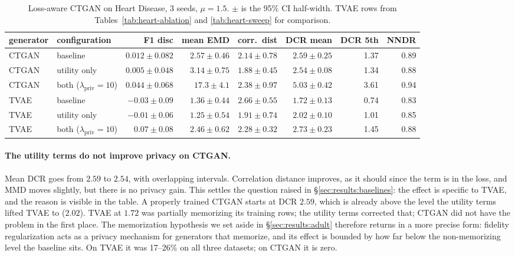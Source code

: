 \documentclass[11pt,a4paper]{article}
\newcommand{\lpriv}{\lambda_{\text{priv}}}
\begin{document}
\begin{table}[htbp]
\caption{Loss-aware CTGAN on Heart Disease, 3 seeds, $\mu = 1.5$. $\pm$ is
the 95\% CI half-width. TVAE rows from Tables~\ref{tab:heart-ablation} and
\ref{tab:heart-sweep} for comparison.}
\label{tab:ctgan-lossaware}
\centering\small
\begin{adjustbox}{max width=\textwidth}
\begin{tabular}{@{}llrrrrrr@{}}
\toprule
generator & configuration & F1 disc & mean EMD & corr.\ dist & DCR mean & DCR 5th & NNDR \\
\midrule
CTGAN & baseline      & $0.012 \pm 0.082$ & $2.57 \pm 0.46$ & $2.14 \pm 0.78$ & $2.59 \pm 0.25$ & 1.37 & 0.89 \\
CTGAN & utility only  & $0.005 \pm 0.048$ & $3.14 \pm 0.75$ & $1.88 \pm 0.45$ & $2.54 \pm 0.08$ & 1.34 & 0.88 \\
CTGAN & both ($\lpriv = 10$) & $0.044 \pm 0.068$ & $17.3 \pm 4.1$ & $2.38 \pm 0.97$ & $5.03 \pm 0.42$ & 3.61 & 0.94 \\
\midrule
TVAE  & baseline      & $-0.03 \pm 0.09$ & $1.36 \pm 0.44$ & $2.66 \pm 0.55$ & $1.72 \pm 0.13$ & 0.74 & 0.83 \\
TVAE  & utility only  & $-0.01 \pm 0.06$ & $1.25 \pm 0.54$ & $1.91 \pm 0.74$ & $2.02 \pm 0.10$ & 1.01 & 0.85 \\
TVAE  & both ($\lpriv = 10$) & $0.07 \pm 0.08$ & $2.46 \pm 0.62$ & $2.28 \pm 0.32$ & $2.73 \pm 0.23$ & 1.45 & 0.88 \\
\bottomrule
\end{tabular}
\end{adjustbox}
\end{table}

\paragraph{The utility terms do not improve privacy on CTGAN.} Mean DCR goes
from $2.59$ to $2.54$, with overlapping intervals. Correlation distance
improves, as it should since the term is in the loss, and MMD moves slightly,
but there is no privacy gain. This settles the question raised in
\S\ref{sec:results:baselines}: the effect is specific to TVAE, and the reason
is visible in the table. A properly trained CTGAN starts at DCR $2.59$, which
is already above the level the utility terms lifted TVAE to ($2.02$). TVAE at
$1.72$ was partially memorizing its training rows; the utility terms corrected
that; CTGAN did not have the problem in the first place. The memorization
hypothesis we set aside in \S\ref{sec:results:adult} therefore returns in a
more precise form: fidelity regularization acts as a privacy mechanism for
generators that memorize, and its effect is bounded by how far below the
non-memorizing level the baseline sits. On TVAE it was 17--26\% on all three
datasets; on CTGAN it is zero.
\end{document}
